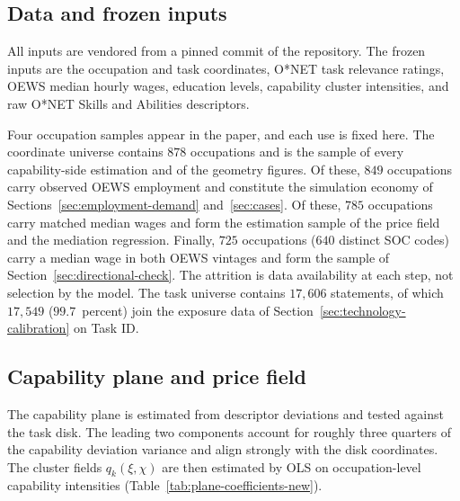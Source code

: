 \documentclass[12pt, a4paper]{article}
\begin{document}
\subsection{Data and frozen inputs}
\label{sec:frozen-inputs}

All inputs are vendored from a pinned commit of the
\textcite{storck2026geometry} repository. The frozen inputs are the
occupation and task coordinates, O*NET task relevance ratings, OEWS
median hourly wages, education levels, capability cluster intensities,
and raw O*NET Skills and Abilities descriptors.

Four occupation samples appear in the paper, and each use is fixed
here. The coordinate universe contains $878$ occupations and is the
sample of every capability-side estimation and of the geometry figures.
Of these, $849$ occupations carry observed OEWS employment and
constitute the simulation economy of Sections~\ref{sec:employment-demand}
and~\ref{sec:cases}. Of these, $785$ occupations carry matched median
wages and form the estimation sample of the price field and the
mediation regression. Finally, $725$ occupations ($640$ distinct SOC
codes) carry a median wage in both OEWS vintages and form the sample of
Section~\ref{sec:directional-check}. The attrition is data
availability at each step, not selection by the model. The task
universe contains $17{,}606$ statements, of which $17{,}549$
($99.7$~percent) join the exposure data of
Section~\ref{sec:technology-calibration} on Task ID.

\subsection{Capability plane and price field}
\label{sec:implementation-plane-price}

The capability plane is estimated from descriptor deviations and tested
against the task disk. The leading two components account for roughly
three quarters of the capability deviation variance and align strongly
with the disk coordinates. The cluster fields $q_k(\xi,\chi)$ are then
estimated by OLS on occupation-level capability intensities
(Table~\ref{tab:plane-coefficients-new}).
\end{document}

